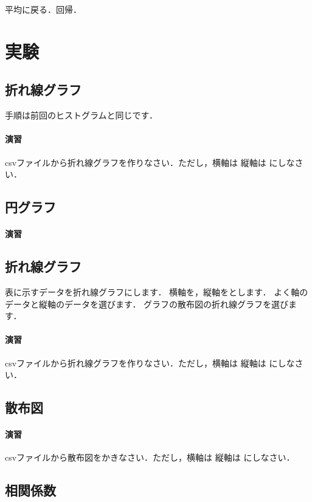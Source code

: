 \documentclass[12pt, a4j]{jreport}
\begin{document}
平均に戻る．回帰．


\section{実験}

\subsection{折れ線グラフ}

手順は前回のヒストグラムと同じです．

\paragraph{演習}
csvファイルから折れ線グラフを作りなさい．ただし，横軸は 縦軸は にしなさい．

\subsection{円グラフ}

\paragraph{演習}


\subsection{折れ線グラフ}

表に示すデータを折れ線グラフにします．
横軸を，縦軸をとします．
よく軸のデータと縦軸のデータを選びます．
グラフの散布図の折れ線グラフを選びます．

\paragraph{演習}
csvファイルから折れ線グラフを作りなさい．ただし，横軸は 縦軸は にしなさい．


\subsection{散布図}

\paragraph{演習}

csvファイルから散布図をかきなさい．ただし，横軸は 縦軸は にしなさい．


\subsection{相関係数}
\end{document}
